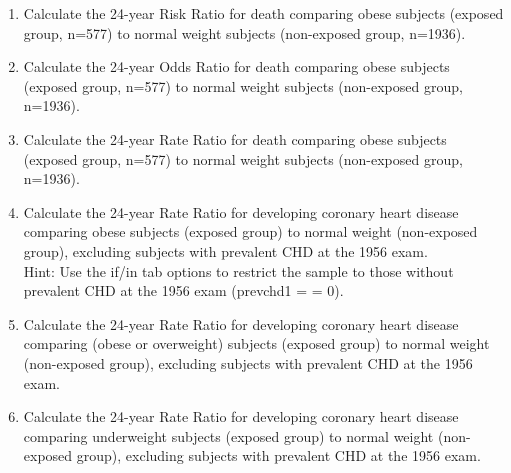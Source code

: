 \documentclass{article}
\begin{document}
\begin{enumerate}
  \item Calculate the 24-year Risk Ratio for death comparing obese subjects (exposed group, n=577) to normal weight subjects (non-exposed group, n=1936). 
  
  \item Calculate the 24-year Odds Ratio for death comparing obese subjects (exposed group, n=577) to normal weight subjects (non-exposed group, n=1936).
  
  \item Calculate the 24-year Rate Ratio for death comparing obese subjects (exposed group, n=577) to normal weight subjects (non-exposed group, n=1936).
  \item Calculate the 24-year Rate Ratio for developing coronary heart disease comparing obese subjects (exposed group) to normal weight (non-exposed group), excluding subjects with prevalent CHD at the 1956 exam.\\
Hint: Use the if/in tab options to restrict the sample to those without prevalent CHD at the 1956 exam (prevchd1 = = 0).\\
  \item Calculate the 24-year Rate Ratio for developing coronary heart disease comparing (obese or overweight) subjects (exposed group) to normal weight (non-exposed group), excluding subjects with prevalent CHD at the 1956 exam.
  \item Calculate the 24-year Rate Ratio for developing coronary heart disease comparing underweight subjects (exposed group) to normal weight (non-exposed group), excluding subjects with prevalent CHD at the 1956 exam.
\end{enumerate}
\end{document}
